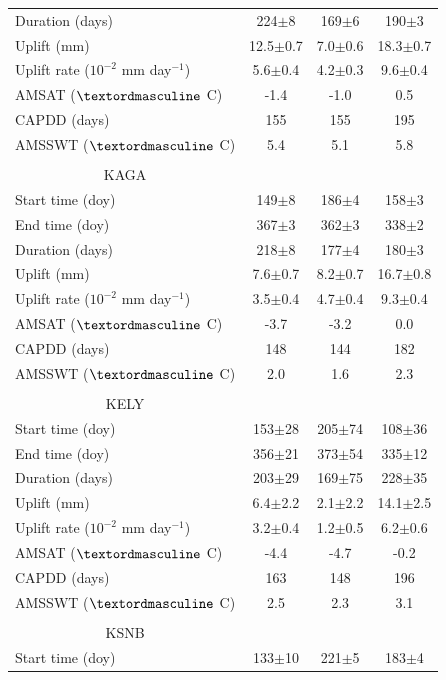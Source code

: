 \begin{center}
\begin{ThreePartTable}
\begin{longtable}{lccc}
				Duration (days) & 224$\pm$8 & 169$\pm$6 & 190$\pm$3\\
				Uplift (mm) & 12.5$\pm$0.7 & 7.0$\pm$0.6 & 18.3$\pm$0.7\\
				Uplift rate ($10^{-2}$ mm day$^{-1}$) & 5.6$\pm$0.4 & 4.2$\pm$0.3 & 9.6$\pm$0.4\\
				AMSAT ($\textordmasculine$ C) & -1.4 & -1.0 & 0.5\\
				CAPDD (days) & 155 & 155 & 195\\
				AMSSWT ($\textordmasculine$ C) & 5.4 & 5.1 & 5.8\\	
				&  &  & \\
				\multicolumn{1}{c}{KAGA} & & & \\
				Start time (doy) & 149$\pm$8 & 186$\pm$4 & 158$\pm$3\\
				End time (doy) & 367$\pm$3 & 362$\pm$3 & 338$\pm$2\\
				Duration (days) & 218$\pm$8 & 177$\pm$4 & 180$\pm$3\\
				Uplift (mm) & 7.6$\pm$0.7 & 8.2$\pm$0.7 & 16.7$\pm$0.8\\
				Uplift rate ($10^{-2}$ mm day$^{-1}$) & 3.5$\pm$0.4 & 4.7$\pm$0.4 & 9.3$\pm$0.4\\
				AMSAT ($\textordmasculine$ C) & -3.7 & -3.2 & 0.0\\
				CAPDD (days) & 148 & 144 & 182\\
				AMSSWT ($\textordmasculine$ C) & 2.0 & 1.6 & 2.3\\
				&  &  & \\
				\multicolumn{1}{c}{KELY} & & & \\
				Start time (doy) & 153$\pm$28 & 205$\pm$74 & 108$\pm$36\\
				End time (doy) & 356$\pm$21 & 373$\pm$54 & 335$\pm$12\\
				Duration (days) & 203$\pm$29 & 169$\pm$75 & 228$\pm$35\\
				Uplift (mm) & 6.4$\pm$2.2 & 2.1$\pm$2.2 & 14.1$\pm$2.5\\
				Uplift rate ($10^{-2}$ mm day$^{-1}$) & 3.2$\pm$0.4 & 1.2$\pm$0.5 & 6.2$\pm$0.6\\
				AMSAT ($\textordmasculine$ C) & -4.4 & -4.7 & -0.2\\
				CAPDD (days) & 163 & 148 & 196\\
				AMSSWT ($\textordmasculine$ C) & 2.5 & 2.3 & 3.1\\
				&  &  & \\
				\multicolumn{1}{c}{KSNB} & & & \\
				Start time (doy) & 133$\pm$10 & 221$\pm$5 & 183$\pm$4\\

\end{longtable}
\end{ThreePartTable}
\end{center}
